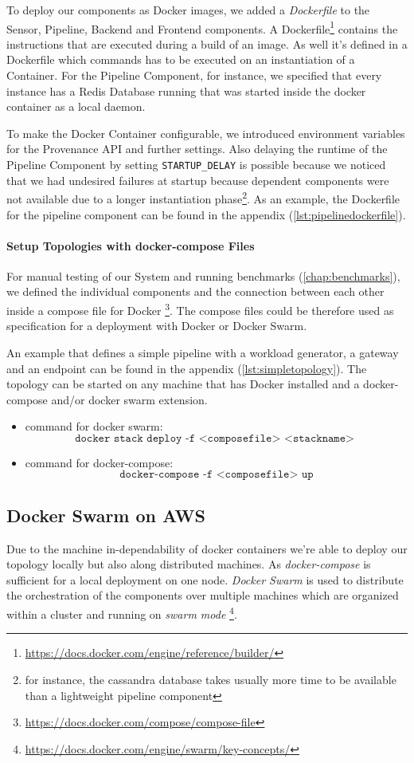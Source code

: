 To deploy our components as Docker images, we added a \emph{Dockerfile} to the Sensor, Pipeline, Backend and Frontend components. A Dockerfile\footnote{\url{https://docs.docker.com/engine/reference/builder/}} contains the instructions that are executed during a build of an image. As well it's defined in a Dockerfile which commands has to be executed on an instantiation of a Container. For the Pipeline Component, for instance, we specified that every instance has a Redis Database running that was started inside the docker container as a local daemon.

To make the Docker Container configurable, we introduced environment variables for the Provenance API and further settings. Also delaying the runtime of the Pipeline Component by setting \texttt{STARTUP\_DELAY} is possible because we noticed that we had undesired failures at startup because dependent components were not available due to a longer instantiation phase\footnote{for instance, the cassandra database takes usually more time to be available than a lightweight pipeline component}. As an example, the Dockerfile for the pipeline component can be found in the appendix (\ref{lst:pipelinedockerfile}).

\paragraph*{Setup Topologies with docker-compose Files} 
For manual testing of our System and running benchmarks (\ref{chap:benchmarks}), we defined the individual components and the connection between each other inside a compose file for Docker \footnote{\url{https://docs.docker.com/compose/compose-file}}. The compose files could be therefore used as specification for a deployment with Docker or Docker Swarm.

An example that defines a simple pipeline with a workload generator, a gateway and an endpoint can be found in the appendix (\ref{lst:simpletopology}).
The topology can be started on any machine that has Docker installed and a docker-compose and/or docker swarm extension.

\begin{itemize}
	\item command for docker swarm: 
		$$\texttt{docker stack deploy -f <composefile> <stackname> }$$
	\item command for docker-compose: 
		$$\texttt{docker-compose -f <composefile> up} $$
\end{itemize}


\subsection{Docker Swarm on AWS}
Due to the machine in-dependability of docker containers we're able to deploy our topology locally but also along distributed machines.
As \emph{docker-compose} is sufficient for a local deployment on one node. \emph{Docker Swarm} is used to distribute the orchestration of the components over multiple machines which are organized within a cluster and running on \emph{swarm mode} \footnote{\url{https://docs.docker.com/engine/swarm/key-concepts/}}.

